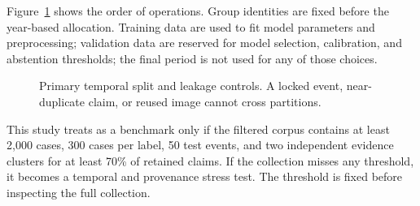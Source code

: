 Figure~\ref{fig:temporal-protocol} shows the order of operations. Group identities are fixed before the year-based allocation. Training data are used to fit model parameters and preprocessing; validation data are reserved for model selection, calibration, and abstention thresholds; the final period is not used for any of those choices.

\begin{figure}[t]
\centering
\resizebox{\columnwidth}{!}{}
\caption{Primary temporal split and leakage controls. A locked event, near-duplicate claim, or reused image cannot cross partitions.}
\label{fig:temporal-protocol}
\end{figure}

This study treats \datasetname{} as a benchmark only if the filtered corpus contains at least 2,000 cases, 300 cases per label, 50 test events, and two independent evidence clusters for at least 70\% of retained claims. If the collection misses any threshold, it becomes a temporal and provenance stress test. The threshold is fixed before inspecting the full collection.


